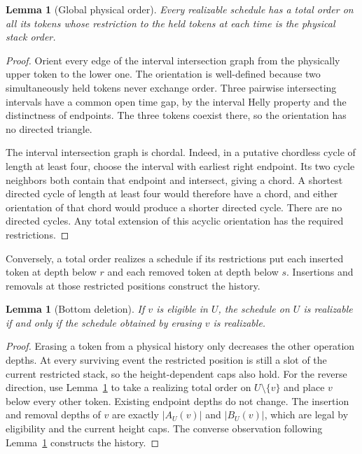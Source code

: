 \documentclass[11pt]{article}
\newtheorem{lemma}[theorem]{Lemma}
\theoremstyle{definition}\newtheorem{definition}[theorem]{Definition}
\theoremstyle{remark}\newtheorem{remark}[theorem]{Remark}
\begin{document}
\begin{lemma}[Global physical order]\label{lem:order}
Every realizable schedule has a total order on all its tokens whose restriction to the held tokens at each time is the physical stack order.
\end{lemma}
\begin{proof}
Orient every edge of the interval intersection graph from the physically upper token to the lower one. The orientation is well-defined because two simultaneously held tokens never exchange order. Three pairwise intersecting intervals have a common open time gap, by the interval Helly property and the distinctness of endpoints. The three tokens coexist there, so the orientation has no directed triangle.

The interval intersection graph is chordal. Indeed, in a putative chordless cycle of length at least four, choose the interval with earliest right endpoint. Its two cycle neighbors both contain that endpoint and intersect, giving a chord. A shortest directed cycle of length at least four would therefore have a chord, and either orientation of that chord would produce a shorter directed cycle. There are no directed cycles. Any total extension of this acyclic orientation has the required restrictions.
\end{proof}

Conversely, a total order realizes a schedule if its restrictions put each inserted token at depth below $r$ and each removed token at depth below $s$. Insertions and removals at those restricted positions construct the history.

\begin{lemma}[Bottom deletion]\label{lem:bottom}
If $v$ is eligible in $U$, the schedule on $U$ is realizable if and only if the schedule obtained by erasing $v$ is realizable.
\end{lemma}
\begin{proof}
Erasing a token from a physical history only decreases the other operation depths. At every surviving event the restricted position is still a slot of the current restricted stack, so the height-dependent caps also hold. For the reverse direction, use Lemma~\ref{lem:order} to take a realizing total order on $U\setminus\{v\}$ and place $v$ below every other token. Existing endpoint depths do not change. The insertion and removal depths of $v$ are exactly $|A_U(v)|$ and $|B_U(v)|$, which are legal by eligibility and the current height caps. The converse observation following Lemma~\ref{lem:order} constructs the history.
\end{proof}
\end{document}
